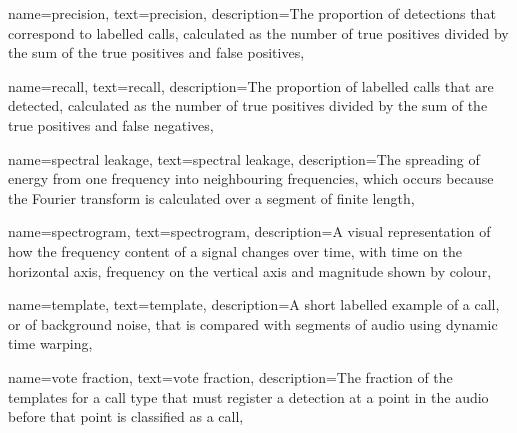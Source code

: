 {
	name=precision,
	text=precision,
	description={The proportion of detections that correspond to labelled calls, calculated as the number of true positives divided by the sum of the true positives and false positives},
}

{
	name=recall,
	text=recall,
	description={The proportion of labelled calls that are detected, calculated as the number of true positives divided by the sum of the true positives and false negatives},
}

{
	name=spectral leakage,
	text=spectral leakage,
	description={The spreading of energy from one frequency into neighbouring frequencies, which occurs because the Fourier transform is calculated over a segment of finite length},
}

{
	name=spectrogram,
	text=spectrogram,
	description={A visual representation of how the frequency content of a signal changes over time, with time on the horizontal axis, frequency on the vertical axis and magnitude shown by colour},
}

{
	name=template,
	text=template,
	description={A short labelled example of a call, or of background noise, that is compared with segments of audio using dynamic time warping},
}

{
	name=vote fraction,
	text=vote fraction,
	description={The fraction of the templates for a call type that must register a detection at a point in the audio before that point is classified as a call},
}
